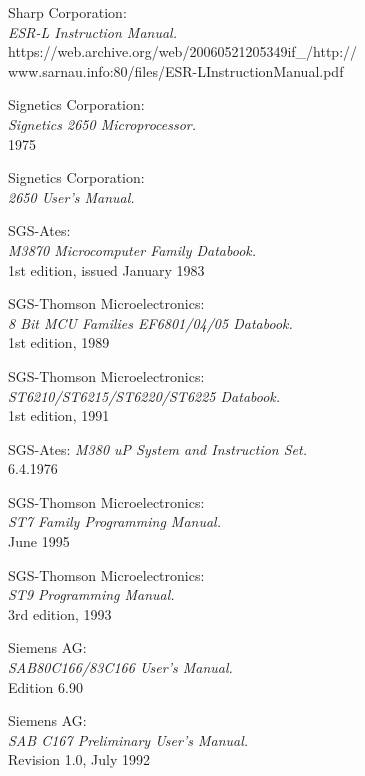  Sharp Corporation: \\
                 {\em ESR-L Instruction Manual.} \\
                 https://web.archive.org/web/20060521205349if\_/http:// \\
                 www.sarnau.info:80/files/ESR-LInstructionManual.pdf

 Signetics Corporation: \\
                 {\em Signetics 2650 Microprocessor.} \\
                 1975

 Signetics Corporation: \\
                 {\em 2650 User's Manual.}

 SGS-Ates: \\
                 {\em M3870 Microcomputer Family Databook.\/}\\
                 1st edition, issued January 1983

 SGS-Thomson Microelectronics: \\
                {\em 8 Bit MCU Families EF6801/04/05 Databook.\/}\\
                1st edition, 1989

 SGS-Thomson Microelectronics: \\
                {\em ST6210/ST6215/ST6220/ST6225 Databook.\/} \\
                1st edition, 1991

 SGS-Ates:
                {\em M380 uP System and Instruction Set.\/} \\
                6.4.1976

 SGS-Thomson Microelectronics: \\
                 {\em ST7 Family Programming Manual.\/} \\
                 June 1995

 SGS-Thomson Microelectronics: \\
               {\em ST9 Programming Manual.\/} \\
               3rd edition, 1993

 Siemens AG: \\
                  {\em SAB80C166/83C166 User's Manual.\/} \\
                  Edition 6.90

 Siemens AG: \\
                  {\em SAB C167 Preliminary User's Manual.\/} \\
                  Revision 1.0, July 1992

